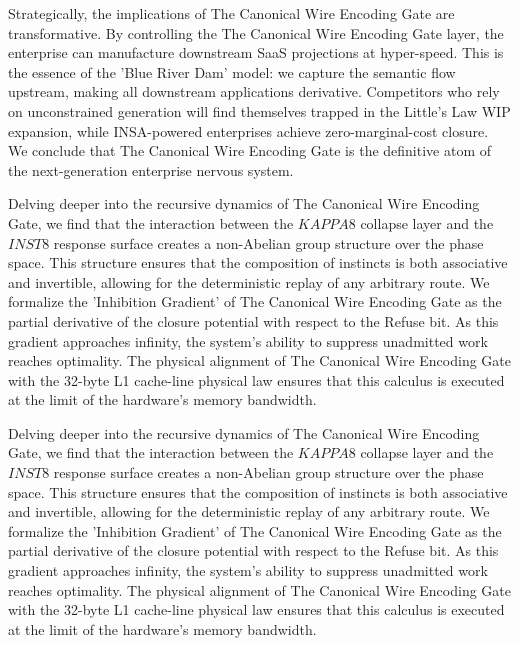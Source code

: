\documentclass[12pt,a4paper,oneside]{book}
\begin{document}
Strategically, the implications of The Canonical Wire Encoding Gate are transformative. By controlling the The Canonical Wire Encoding Gate layer, the enterprise can manufacture downstream SaaS projections at hyper-speed. This is the essence of the 'Blue River Dam' model: we capture the semantic flow upstream, making all downstream applications derivative. Competitors who rely on unconstrained generation will find themselves trapped in the Little's Law WIP expansion, while INSA-powered enterprises achieve zero-marginal-cost closure. We conclude that The Canonical Wire Encoding Gate is the definitive atom of the next-generation enterprise nervous system. 

Delving deeper into the recursive dynamics of The Canonical Wire Encoding Gate, we find that the interaction between the $KAPPA8$ collapse layer and the $INST8$ response surface creates a non-Abelian group structure over the phase space. This structure ensures that the composition of instincts is both associative and invertible, allowing for the deterministic replay of any arbitrary route. We formalize the 'Inhibition Gradient' of The Canonical Wire Encoding Gate as the partial derivative of the closure potential with respect to the Refuse bit. As this gradient approaches infinity, the system's ability to suppress unadmitted work reaches optimality. The physical alignment of The Canonical Wire Encoding Gate with the 32-byte L1 cache-line physical law ensures that this calculus is executed at the limit of the hardware's memory bandwidth. 

Delving deeper into the recursive dynamics of The Canonical Wire Encoding Gate, we find that the interaction between the $KAPPA8$ collapse layer and the $INST8$ response surface creates a non-Abelian group structure over the phase space. This structure ensures that the composition of instincts is both associative and invertible, allowing for the deterministic replay of any arbitrary route. We formalize the 'Inhibition Gradient' of The Canonical Wire Encoding Gate as the partial derivative of the closure potential with respect to the Refuse bit. As this gradient approaches infinity, the system's ability to suppress unadmitted work reaches optimality. The physical alignment of The Canonical Wire Encoding Gate with the 32-byte L1 cache-line physical law ensures that this calculus is executed at the limit of the hardware's memory bandwidth. 
\end{document}
